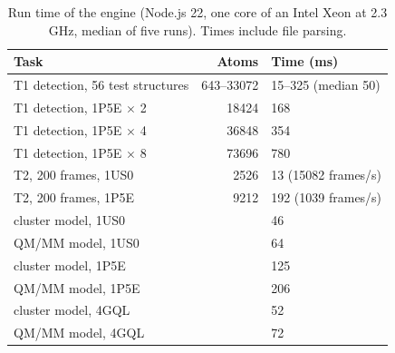 \begin{table}[!htbp]\centering\footnotesize
\caption{Run time of the \BX{} engine (Node.js 22, one core of an Intel Xeon at 2.3 GHz, median of five runs). Times include file parsing.}\label{tab:perf}
\begin{tabular}{lrl}\toprule Task & Atoms & Time (ms)\\\midrule
T1 detection, 56 test structures & 643--33072 & 15--325 (median 50)\\
T1 detection, 1P5E $\times$ 2 & 18424 & 168\\
T1 detection, 1P5E $\times$ 4 & 36848 & 354\\
T1 detection, 1P5E $\times$ 8 & 73696 & 780\\
T2, 200 frames, 1US0 & 2526 & 13 (15082 frames/s)\\
T2, 200 frames, 1P5E & 9212 & 192 (1039 frames/s)\\
cluster model, 1US0 &  & 46\\
QM/MM model, 1US0 &  & 64\\
cluster model, 1P5E &  & 125\\
QM/MM model, 1P5E &  & 206\\
cluster model, 4GQL &  & 52\\
QM/MM model, 4GQL &  & 72\\
\bottomrule\end{tabular}\end{table}
